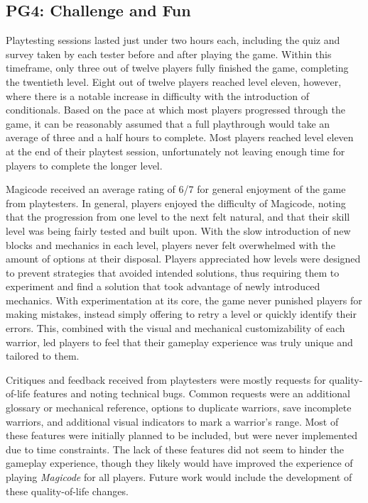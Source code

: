 \documentclass[10pt,twocolumn]{article}
\begin{document}
\subsection{PG4: Challenge and Fun}
Playtesting sessions lasted just under two hours each, including the quiz and survey taken by each tester before and after playing the game. Within this timeframe, only three out of twelve players fully finished the game, completing the twentieth level. Eight out of twelve players reached level eleven, however, where there is a notable increase in difficulty with the introduction of conditionals. Based on the pace at which most players progressed through the game, it can be reasonably assumed that a full playthrough would take an average of three and a half hours to complete. Most players reached level eleven at the end of their playtest session, unfortunately not leaving enough time for players to complete the longer level.

Magicode received an average rating of 6/7 for general enjoyment of the game from playtesters. In general, players enjoyed the difficulty of Magicode, noting that the progression from one level to the next felt natural, and that their skill level was being fairly tested and built upon. With the slow introduction of new blocks and mechanics in each level, players never felt overwhelmed with the amount of options at their disposal. Players appreciated how levels were designed to prevent strategies that avoided intended solutions, thus requiring them to experiment and find a solution that took advantage of newly introduced mechanics. With experimentation at its core, the game never punished players for making mistakes, instead simply offering to retry a level or quickly identify their errors. This, combined with the visual and mechanical customizability of each warrior, led players to feel that their gameplay experience was truly unique and tailored to them.

Critiques and feedback received from playtesters were mostly requests for quality-of-life features and noting technical bugs. Common requests were an additional glossary or mechanical reference, options to duplicate warriors, save incomplete warriors, and additional visual indicators to mark a warrior’s range. Most of these features were initially planned to be included, but were never implemented due to time constraints. The lack of these features did not seem to hinder the gameplay experience, though they likely would have improved the experience of playing \textit{Magicode} for all players. Future work would include the development of these quality-of-life changes.
\end{document}
